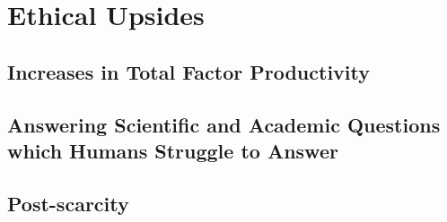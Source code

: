 \section{Ethical Upsides}

\subsection{Increases in Total Factor Productivity}
\subsection{Answering Scientific and Academic Questions which Humans Struggle to Answer}
\subsection{Post-scarcity}
